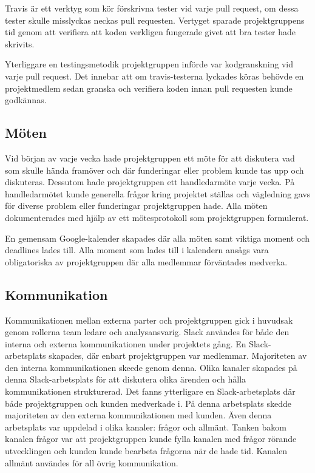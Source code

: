 Travis är ett verktyg som kör förskrivna tester vid varje pull request, om dessa tester skulle misslyckas neckas pull requesten. Vertyget sparade projektgruppens tid genom att verifiera att koden verkligen fungerade givet att bra tester hade skrivits.

Yterliggare en testingsmetodik projektgruppen införde var kodgranskning vid varje pull request. Det innebar att om travis-testerna lyckades köras behövde en projektmedlem sedan granska och verifiera koden innan pull requesten kunde godkännas.

\subsection{Möten}
Vid början av varje vecka hade projektgruppen ett möte för att diskutera vad som skulle hända framöver och där funderingar eller problem kunde tas upp och diskuteras. Dessutom hade projektgruppen ett handledarmöte varje vecka. På handledarmötet kunde generella frågor kring projektet ställas och vägledning gavs för diverse problem eller funderingar projektgruppen hade. Alla möten dokumenterades med hjälp av ett mötesprotokoll som projektgruppen formulerat.

En gemensam Google-kalender skapades där alla möten samt viktiga moment och deadlines lades till. Alla moment som lades till i kalendern ansågs vara obligatoriska av projektgruppen där alla medlemmar förväntades medverka.

\subsection{Kommunikation}
Kommunikationen mellan externa parter och projektgruppen gick i huvudsak genom rollerna team ledare och analysansvarig. Slack användes för både den interna och externa kommunikationen under projektets gång. En Slack-arbetsplats skapades, där enbart projektgruppen var medlemmar. Majoriteten av den interna kommunikationen skeede genom denna. Olika kanaler skapades på denna Slack-arbetsplats för att diskutera olika ärenden och hålla kommunikationen strukturerad. Det fanns ytterligare en Slack-arbetsplats där både projektgruppen och kunden medverkade i. På denna arbetsplats skedde majoriteten av den externa kommunikationen med kunden. Även denna arbetsplats var uppdelad i olika kanaler: frågor och allmänt. Tanken bakom kanalen frågor var att projektgruppen kunde fylla kanalen med frågor rörande utvecklingen och kunden kunde bearbeta frågorna när de hade tid. Kanalen allmänt användes för all övrig kommunikation.

